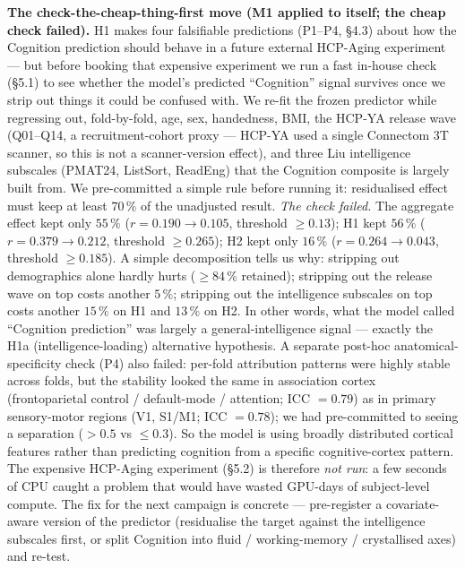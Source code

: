 \documentclass[11pt,letterpaper]{report}
\begin{document}
\textbf{The check-the-cheap-thing-first move (M1 applied to itself; the cheap check failed).} H1 makes four falsifiable predictions (P1--P4, \S4.3) about how the Cognition prediction should behave in a future external HCP-Aging experiment --- but before booking that expensive experiment we run a fast in-house check (\S5.1) to see whether the model's predicted ``Cognition'' signal survives once we strip out things it could be confused with. We re-fit the frozen predictor while regressing out, fold-by-fold, age, sex, handedness, BMI, the HCP-YA release wave (Q01--Q14, a recruitment-cohort proxy --- HCP-YA used a single Connectom 3T scanner, so this is not a scanner-version effect), and three Liu intelligence subscales (PMAT24, ListSort, ReadEng) that the Cognition composite is largely built from. We pre-committed a simple rule before running it: residualised effect must keep at least $70\,\%$ of the unadjusted result. \emph{The check failed.} The aggregate effect kept only $55\,\%$ ($r = 0.190 \rightarrow 0.105$, threshold $\ge 0.13$); H1 kept $56\,\%$ ($r = 0.379 \rightarrow 0.212$, threshold $\ge 0.265$); H2 kept only $16\,\%$ ($r = 0.264 \rightarrow 0.043$, threshold $\ge 0.185$). A simple decomposition tells us why: stripping out demographics alone hardly hurts ($\ge 84\,\%$ retained); stripping out the release wave on top costs another $5\,\%$; stripping out the intelligence subscales on top costs another $15\,\%$ on H1 and $13\,\%$ on H2. In other words, what the model called ``Cognition prediction'' was largely a general-intelligence signal --- exactly the H1a (intelligence-loading) alternative hypothesis. A separate post-hoc anatomical-specificity check (P4) also failed: per-fold attribution patterns were highly stable across folds, but the stability looked the same in association cortex (frontoparietal control / default-mode / attention; ICC $= 0.79$) as in primary sensory-motor regions (V1, S1/M1; ICC $= 0.78$); we had pre-committed to seeing a separation ($> 0.5$ vs $\le 0.3$). So the model is using broadly distributed cortical features rather than predicting cognition from a specific cognitive-cortex pattern. The expensive HCP-Aging experiment (\S5.2) is therefore \emph{not run}: a few seconds of CPU caught a problem that would have wasted GPU-days of subject-level compute. The fix for the next campaign is concrete --- pre-register a covariate-aware version of the predictor (residualise the target against the intelligence subscales first, or split Cognition into fluid / working-memory / crystallised axes) and re-test.
\end{document}
